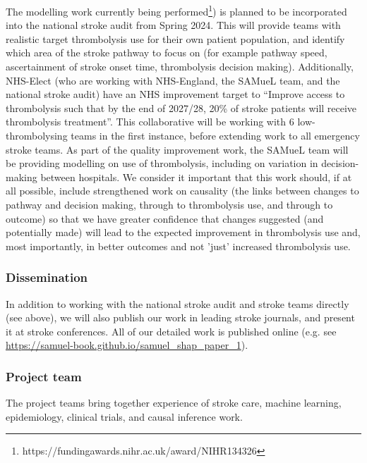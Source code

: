 The modelling work currently being performed\footnote{https://fundingawards.nihr.ac.uk/award/NIHR134326}) is planned to be incorporated into the national stroke audit from Spring 2024. This will provide teams with realistic target thrombolysis use for their own patient population, and identify which area of the stroke pathway to focus on (for example pathway speed, ascertainment of stroke onset time, thrombolysis decision making). Additionally, NHS-Elect (who are working with NHS-England, the SAMueL team, and the national stroke audit) have an NHS improvement target to “Improve access to thrombolysis such that by the end of 2027/28, 20\% of stroke patients will receive thrombolysis treatment”. This collaborative will be working with 6 low-thrombolysing teams in the first instance, before extending work to all emergency stroke teams. As part of the quality improvement work, the SAMueL team will be providing modelling on use of thrombolysis, including on variation in decision-making between hospitals. We consider it important that this work should, if at all possible, include strengthened work on causality (the links between changes to pathway and decision making, through to thrombolysis use, and through to outcome) so that we have greater confidence that changes suggested (and potentially made) will lead to the expected improvement in thrombolysis use and, most importantly, in better outcomes and not 'just' increased thrombolysis use.

\subsubsection{Dissemination}

In addition to working with the national stroke audit and stroke teams directly (see above), we will also publish our work in leading stroke journals, and present it at stroke conferences. All of our detailed work is published online (e.g. see \url{https://samuel-book.github.io/samuel_shap_paper_1}).

\subsubsection{Project team}

The project teams bring together experience of stroke care, machine learning, epidemiology, clinical trials, and causal inference work.

